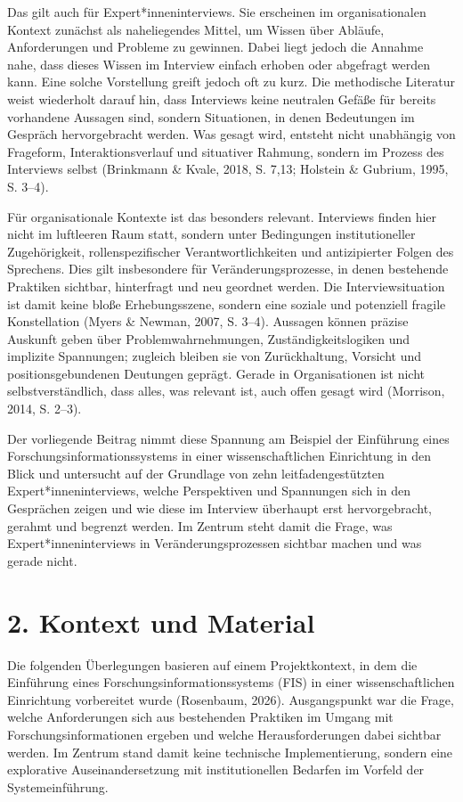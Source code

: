 \documentclass[a4paper,
fontsize=11pt,
oneside,
numbers=noperiodatend,
parskip=half-,
bibliography=totoc,
final
]{scrartcl}
\begin{document}
Das gilt auch für Expert*inneninterviews. Sie erscheinen im
organisationalen Kontext zunächst als naheliegendes Mittel, um Wissen
über Abläufe, Anforderungen und Probleme zu gewinnen. Dabei liegt jedoch
die Annahme nahe, dass dieses Wissen im Interview einfach erhoben oder
abgefragt werden kann. Eine solche Vorstellung greift jedoch oft zu
kurz. Die methodische Literatur weist wiederholt darauf hin, dass
Interviews keine neutralen Gefäße für bereits vorhandene Aussagen sind,
sondern Situationen, in denen Bedeutungen im Gespräch hervorgebracht
werden. Was gesagt wird, entsteht nicht unabhängig von Frageform,
Interaktionsverlauf und situativer Rahmung, sondern im Prozess des
Interviews selbst (Brinkmann \& Kvale, 2018, S. 7,13; Holstein \&
Gubrium, 1995, S. 3--4).

Für organisationale Kontexte ist das besonders relevant. Interviews
finden hier nicht im luftleeren Raum statt, sondern unter Bedingungen
institutioneller Zugehörigkeit, rollenspezifischer Verantwortlichkeiten
und antizipierter Folgen des Sprechens. Dies gilt insbesondere für
Veränderungsprozesse, in denen bestehende Praktiken sichtbar,
hinterfragt und neu geordnet werden. Die Interviewsituation ist damit
keine bloße Erhebungsszene, sondern eine soziale und potenziell fragile
Konstellation (Myers \& Newman, 2007, S. 3--4). Aussagen können präzise
Auskunft geben über Problemwahrnehmungen, Zuständigkeitslogiken und
implizite Spannungen; zugleich bleiben sie von Zurückhaltung, Vorsicht
und positionsgebundenen Deutungen geprägt. Gerade in Organisationen ist
nicht selbstverständlich, dass alles, was relevant ist, auch offen
gesagt wird (Morrison, 2014, S. 2--3).

Der vorliegende Beitrag nimmt diese Spannung am Beispiel der Einführung
eines Forschungsinformationssystems in einer wissenschaftlichen
Einrichtung in den Blick und untersucht auf der Grundlage von zehn
leitfadengestützten Expert*inneninterviews, welche Perspektiven und
Spannungen sich in den Gesprächen zeigen und wie diese im Interview
überhaupt erst hervorgebracht, gerahmt und begrenzt werden. Im Zentrum
steht damit die Frage, was Expert*innenin\-terviews in
Veränderungsprozessen sichtbar machen und was gerade nicht.

\section{2. Kontext und Material}\label{kontext-und-material}

Die folgenden Überlegungen basieren auf einem Projektkontext, in dem die
Einführung eines Forschungsinformationssystems (FIS) in einer
wissenschaftlichen Einrichtung vorbereitet wurde (Rosenbaum, 2026).
Ausgangspunkt war die Frage, welche Anforderungen sich aus bestehenden
Praktiken im Umgang mit Forschungsinformationen ergeben und welche
Herausforderungen dabei sichtbar werden. Im Zentrum stand damit keine
technische Implementierung, sondern eine explorative Auseinandersetzung
mit institutionellen Bedarfen im Vorfeld der Systemeinführung.
\end{document}
